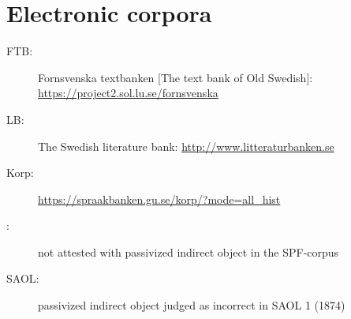 \documentclass[output=paper]{langscibook}
\begin{document}
\section*{Electronic corpora}

\begin{description}
\item[FTB:] Fornsvenska textbanken [The text bank of Old Swedish]: \url{https://project2.sol.lu.se/fornsvenska} 
\item[LB:] The Swedish literature bank: \url{http://www.litteraturbanken.se}
\item[Korp:] \url{https://spraakbanken.gu.se/korp/?mode=all_hist}
\end{description}


\label{falk:appendix:1}

\begin{description}
\item[\normalfont *:] not attested with passivized indirect object in the SPF-corpus
\item[\normalfont SAOL:] passivized indirect object judged as incorrect in SAOL 1 (1874)
\end{description}
\end{document}
